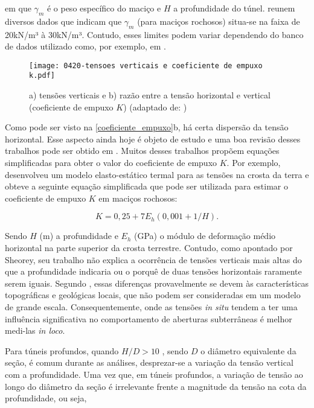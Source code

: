 em que $\gamma_m$ é o peso específico do maciço e $H$ a profundidade do túnel.  reunem diversos dados que indicam que $\gamma_m$ (para maciços rochosos) situa-se na faixa de 20kN/m³ à 30kN/m³. Contudo, esses limites podem variar dependendo do banco de dados utilizado como, por exemplo, em .

\begin{figure}[H]
	\begin{center}
		\texttt{[image: 0420-tensoes verticais e coeficiente de empuxo k.pdf]}
	\end{center}
	\caption{\label{coeficiente_empuxo}a) tensões verticais e b) razão entre a tensão horizontal e vertical (coeficiente de empuxo $K$)  (adaptado de: )}
\end{figure}

Como pode ser visto na \autoref{coeficiente_empuxo}b, há certa dispersão da tensão horizontal. Esse aspecto ainda hoje é objeto de estudo e uma boa revisão desses trabalhos pode ser obtido em . Muitos desses trabalhos propõem equações simplificadas para obter o valor do coeficiente de empuxo $K$. Por exemplo,  desenvolveu um modelo elasto-estático termal para as tensões na crosta da terra e obteve a seguinte equação simplificada que pode ser utilizada para estimar o coeficiente de empuxo $K$ em maciços rochosos:

\begin{equation}
	K = 0,25 + 7E_h(0,001+1/H).
\end{equation}

Sendo $H$ (m) a profundidade e $E_h$ (GPa) o módulo de deformação médio horizontal na parte superior da crosta terrestre. Contudo, como apontado por Sheorey, seu trabalho não explica a ocorrência de tensões verticais mais altas do que a profundidade indicaria ou o porquê de duas tensões horizontais raramente serem iguais. Segundo , essas diferenças provavelmente se devem às características topográficas e geológicas locais, que não podem ser consideradas em um modelo de grande escala. Consequentemente, onde as tensões \textit{in situ} tendem a ter uma influência significativa no comportamento de aberturas subterrâneas é melhor medi-las \textit{in loco}.

Para túneis profundos, quando $H/D > 10$ , sendo $D$ o diâmetro equivalente da seção, é comum durante as análises, desprezar-se a variação da tensão vertical com a profundidade. Uma vez que, em túneis profundos, a variação de tensão ao longo do diâmetro da seção é irrelevante frente a magnitude da tensão na cota da profundidade, ou seja,

